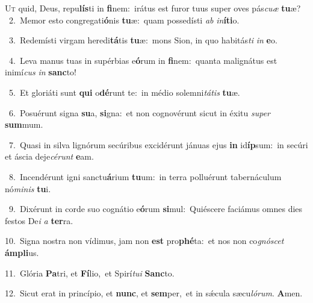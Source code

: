\lettrine{\initial\textcolor{\initialcolor}{U}}{t} quid, Deus, repu\-\textbf{lís}\-ti in \textbf{fi}\-nem:~\star irátus est furor tuus super oves pás\-\textit{cu}\-\textit{æ} \textbf{tu}\-æ?\\
{\numbfont\textcolor{\numbcolor}{~2.}}~Memor esto congregati\-\textbf{ó}\-nis \textbf{tu}\-æ:~\star quam possedísti \textit{ab} \textit{in}\-\textbf{í}\textbf{ti}o.\par
{\numbfont\textcolor{\numbcolor}{~3.}}~Redemísti virgam heredi\-\textbf{tá}\-tis \textbf{tu}\-æ:~\star mons Sion, in quo habitás\textit{ti} \textit{in} \textbf{e}\-o.\par
{\numbfont\textcolor{\numbcolor}{~4.}}~Leva manus tuas in supérbias e\-\textbf{ó}\-rum in \textbf{fi}\-nem:~\star quanta malignátus est inimí\textit{cus} \textit{in} \textbf{sanc}\-to!\par
{\numbfont\textcolor{\numbcolor}{~5.}}~Et gloriáti sunt \textbf{qui} o\-\textbf{dé}\-runt te:~\star in médio solemni\-\textit{tá}\-\textit{tis} \textbf{tu}\-æ.\par
{\numbfont\textcolor{\numbcolor}{~6.}}~Posuérunt signa \textbf{su}\-a, \textbf{si}\-gna:~\star et non cognovérunt sicut in éxitu \textit{su}\-\textit{per} \textbf{sum}\-mum.\par
{\numbfont\textcolor{\numbcolor}{~7.}}~Quasi in silva lignórum secúribus excidérunt jánuas ejus \textbf{in} id\-\textbf{íp}\-sum:~\star in secúri et áscia deje\-\textit{cé}\-\textit{runt} \textbf{e}\-am.\par
{\numbfont\textcolor{\numbcolor}{~8.}}~Incendérunt igni sanctu\-\textbf{á}\-rium \textbf{tu}\-um:~\star in terra polluérunt tabernáculum nó\-\textit{mi}\-\textit{nis} \textbf{tu}\-i.\par
{\numbfont\textcolor{\numbcolor}{~9.}}~Dixérunt in corde suo cognátio e\-\textbf{ó}\-rum \textbf{si}\-mul:~\star Quiéscere faciámus omnes dies festos De\textit{i} \textit{a} \textbf{ter}\-ra.\par
{\numbfont\textcolor{\numbcolor}{10.}}~Signa nostra non vídimus, jam non \textbf{est} pro\-\textbf{phé}\-ta:~\star et nos non co\-\textit{gnó}\-\textit{scet} \textbf{ám}\-\textbf{pli}us.\par
{\numbfont\textcolor{\numbcolor}{11.}}~Glória \textbf{Pa}\-tri, et \textbf{Fí}\-lio,~\star et Spirí\-\textit{tu}\-\textit{i} \textbf{Sanc}\-to.\par
{\numbfont\textcolor{\numbcolor}{12.}}~Sicut erat in princípio, et \textbf{nunc}\-, et \textbf{sem}\-per,~\star et in sǽcula sæcu\-\textit{ló}\-\textit{rum}. \textbf{A}\-men.\par
